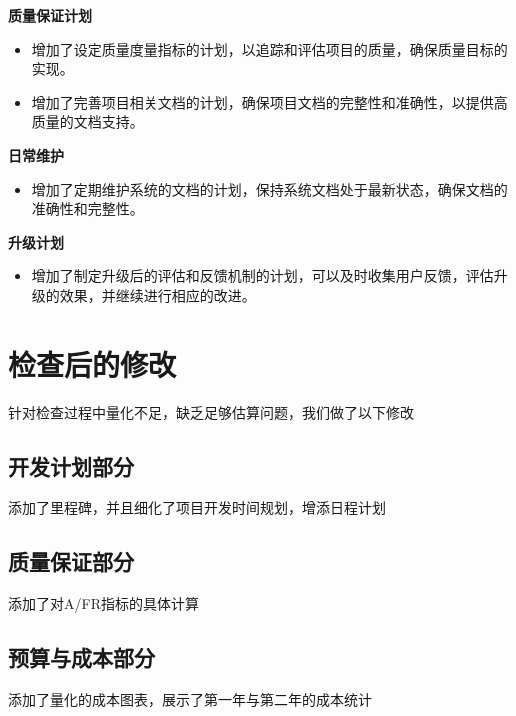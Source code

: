 \documentclass{article}
\begin{document}
\textbf{质量保证计划}
\begin{itemize}
	\item 增加了设定质量度量指标的计划，以追踪和评估项目的质量，确保质量目标的实现。
	\item 增加了完善项目相关文档的计划，确保项目文档的完整性和准确性，以提供高质量的文档支持。
\end{itemize}

\textbf{日常维护}
\begin{itemize}
	\item 增加了定期维护系统的文档的计划，保持系统文档处于最新状态，确保文档的准确性和完整性。
\end{itemize}

\textbf{升级计划}
\begin{itemize}
	\item 增加了制定升级后的评估和反馈机制的计划，可以及时收集用户反馈，评估升级的效果，并继续进行相应的改进。
\end{itemize}


\section{检查后的修改}
针对检查过程中量化不足，缺乏足够估算问题，我们做了以下修改
\subsection{开发计划部分}
添加了里程碑，并且细化了项目开发时间规划，增添日程计划

\subsection{质量保证部分}
添加了对A/FR指标的具体计算

\subsection{预算与成本部分}
添加了量化的成本图表，展示了第一年与第二年的成本统计
\end{document}
